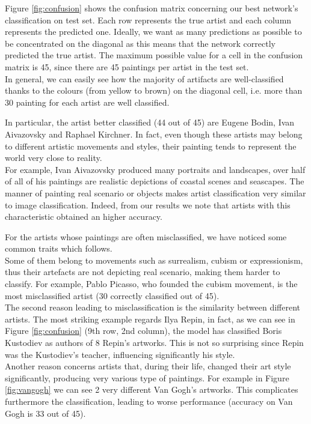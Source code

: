 \documentclass{article}
\begin{document}
Figure \ref{fig:confusion} shows the confusion matrix concerning our best network's classification on test set. Each row represents the true artist and each column represents the predicted one. Ideally, we want as many predictions as possible to be concentrated on the diagonal as this means that the network correctly predicted the true artist. The maximum possible value for a cell in the confusion matrix is 45, since there are 45 paintings per artist in the test set.\\
In general, we can easily see how the majority of artifacts are well-classified thanks to the colours (from yellow to brown) on the diagonal cell, i.e. more than 30 painting for each artist are well classified.

In particular, the artist better classified (44 out of 45) are Eugene Bodin, Ivan Aivazovsky and Raphael Kirchner. In fact, even though these artists may belong to different artistic movements and styles, their painting tends to represent the world very close to reality.\\
For example, Ivan Aivazovsky produced many portraits and landscapes, over half of all of his paintings are realistic depictions of coastal scenes and seascapes. The manner of painting real scenario or objects makes artist classification very similar to image classification. Indeed, from our results we note that artists with this characteristic obtained an higher accuracy.

For the artists whose paintings are often misclassified, we have noticed some common traits which follows.\\
Some of them belong to movements such as surrealism, cubism or expressionism, thus their artefacts are not depicting real scenario, making them harder to classify.
For example, Pablo Picasso, who founded the cubism movement, is the most misclassified artist (30 correctly classified out of 45).\\
The second reason leading to misclassification is the similarity  between different artists. The most striking example regards Ilya Repin, in fact, as we can see in Figure \ref{fig:confusion} (9th row, 2nd column), the model has classified Boris Kustodiev as authors of 8 Repin's artworks. This is not so surprising since Repin was the Kustodiev's teacher, influencing significantly his style. \\
Another reason concerns artists that, during their life, changed their art style significantly, producing very various type of paintings. For example in Figure \ref{fig:vangogh} we can see 2 very different Van Gogh's artworks. This complicates furthermore the classification, leading to worse performance (accuracy on Van Gogh is 33 out of 45).
\end{document}
